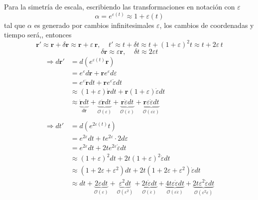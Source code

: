 \documentclass[]{article}
\numberwithin{equation}{section}
\newcommand{\0}{\textcolor{gray}{0}}
\newcommand{\rv}{\mathbf{r}}
\begin{document}
\begin{enumerate}
	Para la simetría de escala, escribiendo las transformaciones en notación con $\varepsilon$
	\begin{equation*}
		\alpha = e^{\varepsilon(t)} \approx 1 + \varepsilon(t)
	\end{equation*}
	tal que $\alpha$ es generado por cambios infinitesimales $\varepsilon$, los cambios de coordenadas y tiempo será,, entonces
	\begin{equation*}
		\rv' \approx \rv + \delta \rv \approx \rv + \varepsilon \, \rv, ~~~~~ t' \approx t + \delta t \approx t + (1 + \varepsilon)^2 t \approx t + 2\varepsilon \, t
	\end{equation*}
	\begin{equation*}
		\delta \rv \approx \varepsilon \rv, ~~~~~ \delta t \approx 2\varepsilon t
	\end{equation*}
	\begin{align*}
		\Rightarrow d \rv' &= d \left(e^{\varepsilon(t)} \rv\right)\\
		&= e^{\varepsilon} d\rv + \rv e^{\varepsilon} d \varepsilon\\
		&= e^{\varepsilon} \dot{\rv} dt + \rv e^{\varepsilon} \dot{\varepsilon} dt \\
		&\approx (1 + \varepsilon) \dot{\rv} dt + \rv (1 + \varepsilon) \dot{\varepsilon} dt \\
		&\approx \underbrace{\dot{\rv} dt}_{d\rv} + \underbrace{\varepsilon \dot{\rv} dt}_{\mathcal{O}(\varepsilon)} + \underbrace{\rv \dot{\varepsilon} dt}_{\mathcal{O}(\dot{\varepsilon})} + \underbrace{\rv \varepsilon \dot{\varepsilon} dt}_{\mathcal{O}(\varepsilon \dot{\varepsilon})}\\
		&\\
		\Rightarrow d t' &= d \left(e^{2\varepsilon(t)} t\right)\\
		&= e^{2\varepsilon} dt + t e^{2\varepsilon} \cdot 2 d \varepsilon\\
		&= e^{2\varepsilon} dt + 2 t e^{2\varepsilon} \dot{\varepsilon} dt \\
		&\approx (1 + \varepsilon)^2 dt + 2 t (1 + \varepsilon)^2 \dot{\varepsilon} dt \\
		&\approx (1 + 2\varepsilon + \varepsilon^2) dt + 2 t (1 + 2\varepsilon + \varepsilon^2) \dot{\varepsilon} dt \\
		&\approx dt + \underbrace{2\varepsilon dt}_{\mathcal{O}(\varepsilon)} + \underbrace{\varepsilon^2 dt}_{\mathcal{O}(\varepsilon^2)} + \underbrace{2 t \dot{\varepsilon} dt}_{\mathcal{O}(\dot{\varepsilon})} + \underbrace{4 t \varepsilon \dot{\varepsilon} dt}_{\mathcal{O}(\varepsilon \dot{\varepsilon})} + \underbrace{2 t \varepsilon^2 \dot{\varepsilon} dt}_{\mathcal{O}(\varepsilon^2 \dot{\varepsilon})}

\end{align*}
\end{enumerate}
\end{document}
